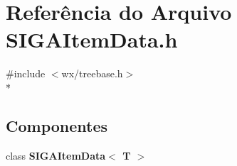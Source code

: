\section{Referência do Arquivo S\+I\+G\+A\+Item\+Data.\+h}
\label{_s_i_g_a_item_data_8h}
{\ttfamily \#include $<$wx/treebase.\+h$>$}\\*
\subsection*{Componentes}
\begin{DoxyCompactItemize}
\item 
class {\bf S\+I\+G\+A\+Item\+Data$<$ T $>$}
\end{DoxyCompactItemize}
